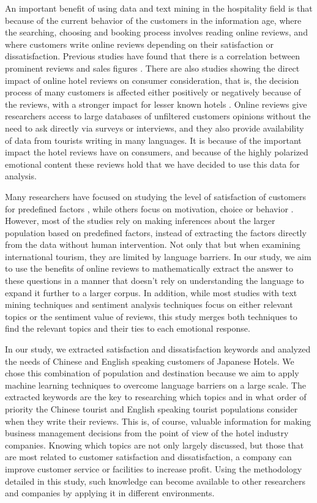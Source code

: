 \documentclass[review]{elsarticle}
\begin{document}
An important benefit of using data and text mining in the hospitality field is that because of the current behavior of the customers in the information age, where the searching, choosing and booking process involves reading online reviews, and where customers write online reviews depending on their satisfaction or dissatisfaction. Previous studies have found that there is a correlation between prominent reviews and sales figures \cite[][]{basuroy2003, ye2009}. There are also studies showing the direct impact of online hotel reviews on consumer consideration, that is, the decision process of many customers is affected either positively or negatively because of the reviews, with a stronger impact for lesser known hotels \cite[][]{vermeulen2009}. Online reviews give researchers access to large databases of unfiltered customers opinions without the need to ask directly via surveys or interviews, and they also provide availability of data from tourists writing in many languages. It is because of the important impact the hotel reviews have on consumers, and because of the highly polarized emotional content these reviews hold that we have decided to use this data for analysis.

Many researchers have focused on studying the level of satisfaction of customers for predefined factors \cite[e.g.][]{balbi2018, kim2017362, truong2009, wu2009, shanka2004, kozak2002}, while others focus on motivation, choice or behavior \cite[e.g.][]{romao2014, dongyang2015}. However, most of the studies rely on making inferences about the larger population based on predefined factors, instead of extracting the factors directly from the data without human intervention. Not only that but when examining international tourism, they are limited by language barriers. In our study, we aim to use the benefits of online reviews to mathematically extract the answer to these questions in a manner that doesn't rely on understanding the language to expand it further to a larger corpus. In addition, while most studies with text mining techniques and sentiment analysis techniques focus on either relevant topics or the sentiment value of reviews, this study merges both techniques to find the relevant topics and their ties to each emotional response.

In our study, we extracted satisfaction and dissatisfaction keywords and analyzed the needs of Chinese and English speaking customers of Japanese Hotels. We chose this combination of population and destination because we aim to apply machine learning techniques to overcome language barriers on a large scale. The extracted keywords are the key to researching which topics and in what order of priority the Chinese tourist and English speaking tourist populations consider when they write their reviews. This is, of course, valuable information for making business management decisions from the point of view of the hotel industry companies. Knowing which topics are not only largely discussed, but those that are most related to customer satisfaction and dissatisfaction, a company can improve customer service or facilities to increase profit. Using the methodology detailed in this study, such knowledge can become available to other researchers and companies by applying it in different environments.
\end{document}
